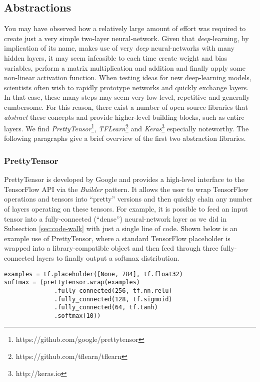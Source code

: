 \subsection{Abstractions}\label{sec:code-abstract}

You may have observed how a relatively large amount of effort was required to
create just a very simple two-layer neural-network. Given that
\emph{deep}-learning, by implication of its name, makes use of very \emph{deep}
neural-networks with many hidden layers, it may seem infeasible to each time
create weight and bias variables, perform a matrix multiplication and addition
and finally apply some non-linear activation function. When testing ideas for
new deep-learning models, scientists often wish to rapidly prototype networks
and quickly exchange layers. In that case, these many steps may seem very
low-level, repetitive and generally cumbersome. For this reason, there exist a
number of open-source libraries that \emph{abstract} these concepts and provide
higher-level building blocks, such as entire layers. We find
\emph{PrettyTensor}\footnote{https://github.com/google/prettytensor},
\emph{TFLearn}\footnote{https://github.com/tflearn/tflearn} and
\emph{Keras}\footnote{http://keras.io} especially noteworthy. The following
paragraphs give a brief overview of the first two abstraction libraries.

\subsubsection{PrettyTensor}\label{sec:code-abstract-prettytensor}

PrettyTensor is developed by Google and provides a high-level interface to the
TensorFlow API via the \emph{Builder} pattern. It allows the user to wrap
TensorFlow operations and tensors into ``pretty'' versions and then quickly
chain any number of layers operating on these tensors. For example, it is
possible to feed an input tensor into a fully-connected (``dense'')
neural-network layer as we did in Subsection \ref{sec:code-walk} with just a
single line of code. Shown below is an example use of PrettyTensor, where a
standard TensorFlow placeholder is wrapped into a library-compatible object and
then feed through three fully-connected layers to finally output a softmax
distribution.

\begin{lstlisting}
examples = tf.placeholder([None, 784], tf.float32)
softmax = (prettytensor.wrap(examples)
              .fully_connected(256, tf.nn.relu)
              .fully_connected(128, tf.sigmoid)
              .fully_connected(64, tf.tanh)
              .softmax(10))
\end{lstlisting}

